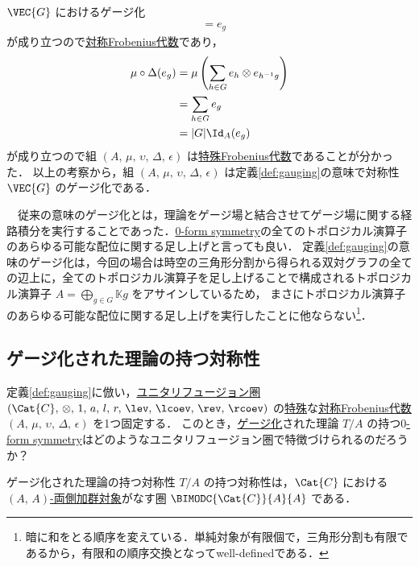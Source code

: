 \documentclass[TQFT_main]{subfiles}
\begin{document}
\begin{myexample}[label=ex:gaiging-VecG]{$\VEC{G}$ におけるゲージ化}
\begin{align}
    &= e_g
\end{align}
が成り立つので\hyperref[def:sym-Frobenius]{対称Frobenius代数}であり，
\begin{align}
    \mu \circ \Delta (e_g) 
    &= \mu \left(\sum_{h \in G} e_h \otimes e_{h^{-1} g}\right) \\
    &= \sum_{h \in G} e_{g} \\
    &= \abs{G} \Id_A (e_g)
\end{align}
が成り立つので組 $(A,\, \mu,\, \upsilon,\, \Delta,\, \epsilon)$ は\hyperref[def:special-Frobenius]{特殊Frobenius代数}であることが分かった．
以上の考察から，組 $(A,\, \mu,\, \upsilon,\, \Delta,\, \epsilon)$ は定義\ref{def:gauging}の意味で対称性 $\VEC{G}$ のゲージ化である．

    　従来の意味のゲージ化とは，理論をゲージ場と結合させてゲージ場に関する経路積分を実行することであった．\hyperref[def:p-form-sym]{0-form symmetry}の全てのトポロジカル演算子のあらゆる可能な配位に関する足し上げと言っても良い．
    定義\ref{def:gauging}の意味のゲージ化は，今回の場合は時空の三角形分割から得られる双対グラフの全ての辺上に，全てのトポロジカル演算子を足し上げることで構成されるトポロジカル演算子 $A = \bigoplus_{g \in G} \mathbb{K} g$ をアサインしているため，
    まさにトポロジカル演算子のあらゆる可能な配位に関する足し上げを実行したことに他ならない\footnote{暗に和をとる順序を変えている．単純対象が有限個で，三角形分割も有限であるから，有限和の順序交換となってwell-definedである．}．
\end{myexample}



\subsection{ゲージ化された理論の持つ対称性}

定義\ref{def:gauging}に倣い，\hyperref[def:tensorfusion-cat]{ユニタリフュージョン圏} $(\Cat{C},\, \otimes,\, 1,\, a,\, l,\, r,\, \lev,\, \lcoev,\, \rev,\, \rcoev)$ の\hyperref[def:special-Frobenius]{特殊}な\hyperref[def:sym-Frobenius]{対称Frobenius代数} $(A,\, \mu,\, \upsilon,\, \Delta,\, \epsilon)$ を1つ固定する．
このとき，\hyperref[def:gauging]{ゲージ化}された理論 $T/A$ の持つ\hyperref[ax:symcat-2d-0form]{$0$-form symmetry}はどのようなユニタリフュージョン圏で特徴づけられるのだろうか？

\begin{mypropph}[label=prop:symcat-2d-gauged]{ゲージ化された理論の持つ対称性}
    $T/A$ の持つ対称性は，$\Cat{C}$ における\hyperref[def:bimodobj]{$(A,\, A)$-両側加群対象}がなす圏 $\BIMODC{\Cat{C}}{A}{A}$ である．
\end{mypropph}
\end{document}
